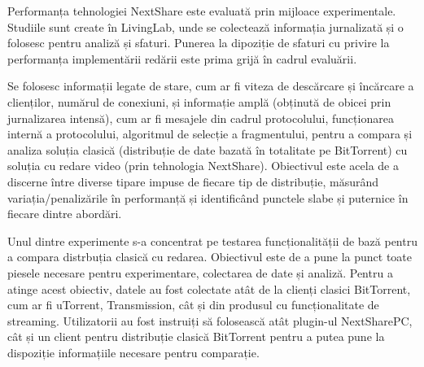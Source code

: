 Performanța tehnologiei NextShare este evaluată prin mijloace experimentale.
Studiile sunt create în LivingLab, unde se colectează informația jurnalizată și o
folosesc pentru analiză și sfaturi. Punerea la dipoziție de sfaturi cu privire
la performanța implementării redării este prima grijă în cadrul evaluării.

Se folosesc informații legate de stare, cum ar fi viteza de descărcare și
încărcare a clienților, numărul de conexiuni, și informație amplă
(obținută de obicei prin jurnalizarea intensă), cum ar fi mesajele din cadrul
protocolului, funcționarea internă a protocolului, algoritmul de selecție
a fragmentului, pentru a compara și analiza soluția clasică
(distribuție de date bazată în totalitate pe BitTorrent) cu soluția cu
redare video (prin tehnologia NextShare). Obiectivul este acela de a 
discerne între diverse tipare impuse de fiecare tip de distribuție,
măsurând variația/penalizările în performanță și identificând punctele
slabe și puternice în fiecare dintre abordări.

Unul dintre experimente s-a concentrat pe testarea funcționalității de
bază pentru a compara distrbuția clasică cu redarea. Obiectivul este de a
pune la punct toate piesele necesare pentru experimentare, colectarea de date
și analiză. Pentru a atinge acest obiectiv, datele au fost colectate atât de la
clienți clasici BitTorrent, cum ar fi uTorrent, Transmission, cât și din
produsul cu funcționalitate de streaming. Utilizatorii au fost instruiți să
folosească atât plugin-ul NextSharePC, cât și un client pentru distribuție
clasică BitTorrent pentru a putea pune la dispoziție informațiile necesare
pentru comparație.


